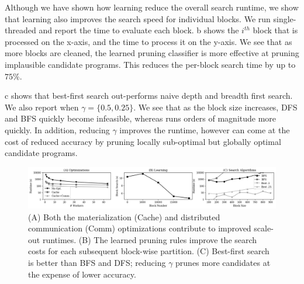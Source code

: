  Although we have shown how learning reduce the overall search runtime, we show that learning also improves the search speed for individual blocks.  We run single-threaded \sys and report the time to evaluate each block.  b shows the $i^{th}$ block that is processed on the x-axis, and the time to process it on the y-axis.   We see that as more blocks are cleaned, the learned pruning classifier is more effective at pruning implausible candidate programs.  This reduces the per-block search time by up to $75\%$.  

 c shows that best-first search out-performs naive depth and breadth first search.  We also report \sys when $\gamma=\{0.5, 0.25\}$.  We see that as the block size increases, DFS and BFS quickly become infeasible, whereas \sys runs orders of magnitude more quickly.  In addition, reducing $\gamma$ improves the runtime, however can come at the cost of reduced accuracy by pruning locally sub-optimal but globally optimal candidate programs.  

 \begin{figure}[ht]
\centering
 \includegraphics[width=\textwidth]{exp/exp6.png}
 \caption{\small 
   (A) Both the materialization (Cache) and distributed communication (Comm) optimizations contribute to improved scale-out runtimes.
   (B) The learned pruning rules improve the search costs for each subsequent block-wise partition.  
   (C) Best-first search is better than BFS and DFS; reducing $\gamma$ prunes more candidates at the expense of lower accuracy.  
 \label{fig:opt}}
\end{figure}
